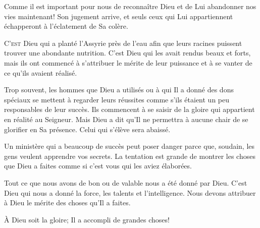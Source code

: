 Comme il est important pour nous de reconnaître Dieu et de Lui abandonner
 nos vies maintenant! Son jugement arrive, et seuls ceux qui Lui appartiennent
 échapperont à l'éclatement de Sa colère. 

\dvrule







\lettrine{C}{'est} Dieu qui a \Og planté \Fg{} l'Assyrie
 près de l'eau afin que leurs racines puissent trouver une abondante nutrition.
 C'est Dieu qui les avait rendus beaux et forts,
 mais ils ont commencé à s'attribuer le mérite de leur puissance
 et à se vanter de ce qu'ils avaient réalisé.


Trop souvent, les hommes que Dieu a utilisés ou à qui Il a donné des dons
 spéciaux se mettent à regarder leurs réussites comme s'ils étaient
 un peu responsables de leur succès.
 Ils commencent à se saisir de la gloire qui appartient en réalité au Seigneur.
 Mais Dieu a dit qu'Il ne permettra à aucune chair de se glorifier
 en Sa présence. Celui qui s'élève sera abaissé.

Un ministère qui a beaucoup de succès peut poser danger parce que,
 soudain, les gens veulent apprendre vos secrets.
 La tentation est grande de montrer les choses que Dieu a faites
 comme si c'est vous qui les aviez élaborées.

Tout ce que nous avons de bon ou de valable nous a été donné par Dieu.
 C'est Dieu qui nous a donné la force, les talents et l'intelligence.
 Nous devons attribuer à Dieu le mérite des choses qu'Il a faites.

À Dieu soit la gloire; Il a accompli de grandes choses!


